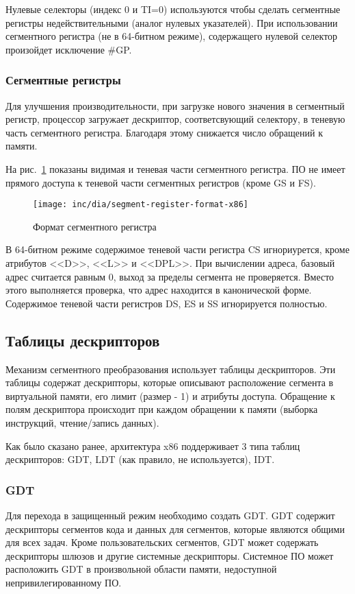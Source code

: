 Нулевые селекторы (индекс 0 и TI=0) используются чтобы сделать сегментные
регистры недействительными (аналог нулевых указателей).
При использовании сегментного регистра (не в 64-битном режиме),
содержащего нулевой селектор произойдет исключение \#GP.

\subsubsection*{Сегментные регистры}
Для улучшения производительности, при загрузке нового значения в сегментный регистр,
процессор загружает дескриптор, соответсвующий селектору, в теневую часть сегментного регистра.
Благодаря этому снижается число обращений к памяти.

На рис.~\ref{fig:segment-register-format-x86} показаны видимая и теневая части сегментного регистра.
ПО не имеет прямого доступа к теневой части сегментных регистров (кроме GS и FS).

\begin{figure}[ht!]
  \centering
  \texttt{[image: inc/dia/segment-register-format-x86]}
  \caption{Формат сегментного регистра}
  \label{fig:segment-register-format-x86}
\end{figure}

В 64-битном режиме содержимое теневой части регистра CS игнориурется, кроме атрибутов <<D>>, <<L>> и <<DPL>>.
При вычислении адреса, базовый адрес считается равным 0, выход за пределы сегмента не проверяется.
Вместо этого выполняется проверка, что адрес находится в канонической форме. Содержимое теневой части
регистров DS, ES и SS игнорируется полностью.

\subsection{Таблицы дескрипторов}
Механизм сегментного преобразования использует таблицы дескрипторов.
Эти таблицы содержат дескрипторы, которые описывают расположение сегмента в виртуальной памяти,
его лимит (размер - 1) и атрибуты доступа. Обращение к полям дескриптора происходит при каждом обращении к
памяти (выборка инструкций, чтение/запись данных).

Как было сказано ранее, архитектура x86 поддерживает 3 типа таблиц дескрипторов: GDT, LDT (как правило, не используется), IDT.

\subsubsection*{GDT}
Для перехода в защищенный режим необходимо создать GDT. GDT содержит дескрипторы
сегментов кода и данных для сегментов, которые являются общими для всех задач.
Кроме пользовательских сегментов, GDT может содержать дескрипторы шлюзов и
другие системные дескрипторы. Системное ПО может расположить GDT в произвольной
области памяти, недоступной непривилегированному ПО.

